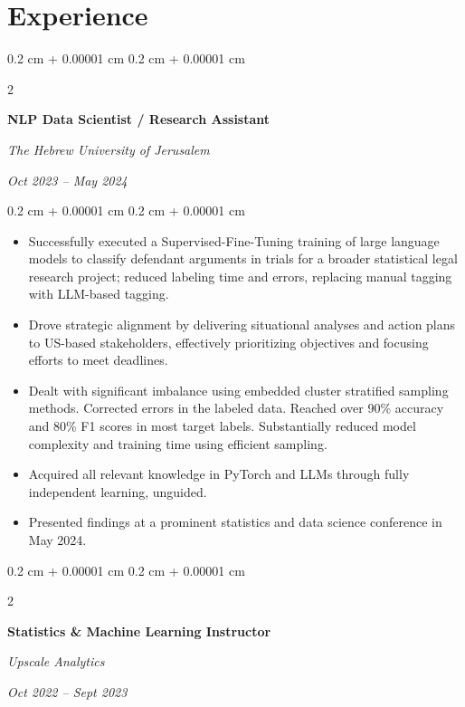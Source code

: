 \documentclass[10pt, letterpaper]{article}
\newenvironment{highlights}{
    \begin{itemize}[
        topsep=0.10 cm,
        parsep=0.8 cm,
        partopsep=0pt,
        itemsep=0pt,
        leftmargin=0.4 cm + 10pt
    ]
}{
    \end{itemize}
} %
\newenvironment{onecolentry}{
    \begin{adjustwidth}{
        0.2 cm + 0.00001 cm
    }{
        0.2 cm + 0.00001 cm
    }
}{
    \end{adjustwidth}
} %
\newenvironment{twocolentry}[2][]{
    \onecolentry
    \def\secondColumn{#2}
    \setcolumnwidth{\fill, 4.5 cm}
    \begin{paracol}{2}
}{
    \switchcolumn \raggedleft \secondColumn
    \end{paracol}
    \endonecolentry
} %
\begin{document}
    \section{Experience}



        
        \begin{twocolentry}{
            
            
        \textit{Oct 2023 – May 2024}}
            \textbf{NLP Data Scientist / Research Assistant}
            
            \textit{The Hebrew University of Jerusalem}
        \end{twocolentry}

        \vspace{0.10 cm}
        \begin{onecolentry}
            \begin{highlights}
                \item Successfully executed a Supervised-Fine-Tuning training of large language models to classify defendant arguments in trials for a broader statistical legal research project; reduced labeling time and errors, replacing manual tagging with LLM-based tagging.
                \item Drove strategic alignment by delivering situational analyses and action plans to US-based stakeholders, effectively prioritizing objectives and focusing efforts to meet deadlines.
                \item Dealt with significant imbalance using embedded cluster stratified sampling methods. Corrected errors in the labeled data. Reached over 90\% accuracy and 80\% F1 scores in most target labels. Substantially reduced model complexity and training time using efficient sampling.
                \item Acquired all relevant knowledge in PyTorch and LLMs through fully independent learning, unguided.
                \item Presented findings at a prominent statistics and data science conference in May 2024.
            \end{highlights}
        \end{onecolentry}


        \vspace{0.2 cm}

        \begin{twocolentry}{
            
            
        \textit{Oct 2022 – Sept 2023}}
            \textbf{Statistics \& Machine Learning Instructor}
            
            \textit{Upscale Analytics}
        \end{twocolentry}
\end{document}
